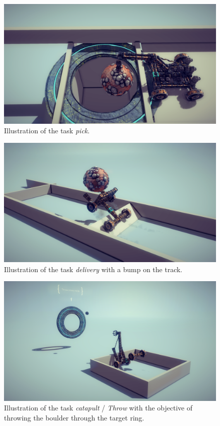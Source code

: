 \begin{figure}[h!]
  \centering
  \includegraphics[width=\linewidth]{figures/tasks/pick.png}
  \caption{\footnotesize Illustration of the task \textit{pick}.}
  \label{fig:task_pick}
\end{figure}


\begin{figure}[h!]
  \centering
  \includegraphics[width=\linewidth]{figures/tasks/delivery.png}
  \caption{\footnotesize Illustration of the task \textit{delivery} with a bump on the track.}
  \label{fig:task_delivery}
\end{figure}


\begin{figure}[h!]
  \centering
  \includegraphics[width=\linewidth]{figures/tasks/thru_ring.png}
  \caption{\footnotesize Illustration of the task \textit{catapult} / \textit{Throw} with the objective of throwing the boulder through the target ring.}
  \label{fig:task_thru_ring}
\end{figure}


